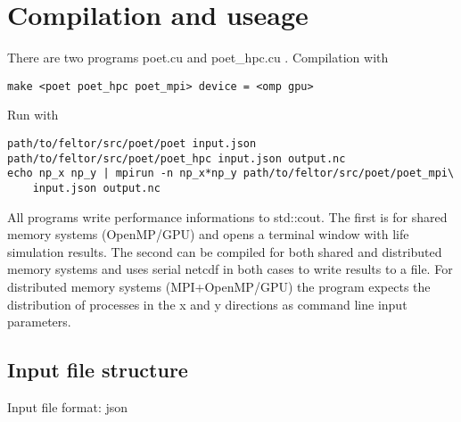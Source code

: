 \section{Compilation and useage}
There are two programs poet.cu and poet\_hpc.cu . Compilation with
\begin{verbatim}
make <poet poet_hpc poet_mpi> device = <omp gpu>
\end{verbatim}
Run with
\begin{verbatim}
path/to/feltor/src/poet/poet input.json
path/to/feltor/src/poet/poet_hpc input.json output.nc
echo np_x np_y | mpirun -n np_x*np_y path/to/feltor/src/poet/poet_mpi\
    input.json output.nc
\end{verbatim}
All programs write performance informations to std::cout.
The first is for shared memory systems (OpenMP/GPU) and opens a terminal window with life simulation results.
 The
second can be compiled for both shared and distributed memory systems and uses serial netcdf in both cases
to write results to a file.
For distributed
memory systems (MPI+OpenMP/GPU) the program expects the distribution of processes in the
x and y directions as command line input parameters.

\subsection{Input file structure}
Input file format: json


